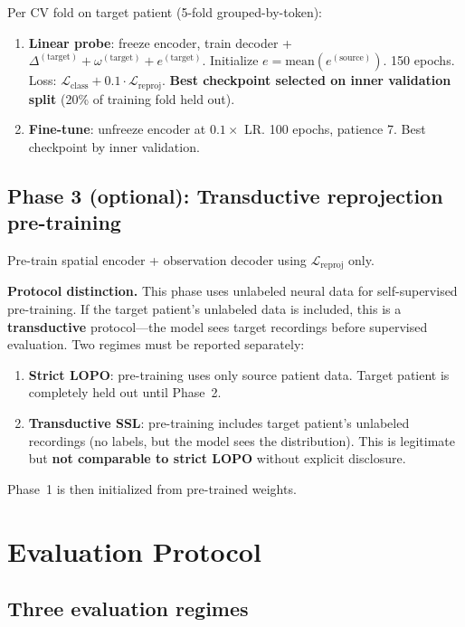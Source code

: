 \documentclass[11pt,letterpaper]{article}
\begin{document}
Per CV fold on target patient (5-fold grouped-by-token):
\begin{enumerate}[leftmargin=2em]
\item \textbf{Linear probe}: freeze encoder, train decoder + $\Delta^{(\text{target})} + \omega^{(\text{target})} + e^{(\text{target})}$. Initialize $e = \text{mean}(e^{(\text{source})})$. 150 epochs. Loss: $\mathcal{L}_{\text{class}} + 0.1 \cdot \mathcal{L}_{\text{reproj}}$. \textbf{Best checkpoint selected on inner validation split} (20\% of training fold held out).
\item \textbf{Fine-tune}: unfreeze encoder at $0.1\times$ LR. 100 epochs, patience 7. Best checkpoint by inner validation.
\end{enumerate}

\subsection{Phase 3 (optional): Transductive reprojection pre-training}\label{sec:phase3}

Pre-train spatial encoder + observation decoder using $\mathcal{L}_{\text{reproj}}$ only.

\textbf{Protocol distinction.} This phase uses unlabeled neural data for self-supervised pre-training. If the target patient's unlabeled data is included, this is a \textbf{transductive} protocol---the model sees target recordings before supervised evaluation. Two regimes must be reported separately:

\begin{enumerate}[leftmargin=2em]
\item \textbf{Strict LOPO}: pre-training uses only source patient data. Target patient is completely held out until Phase~2.
\item \textbf{Transductive SSL}: pre-training includes target patient's unlabeled recordings (no labels, but the model sees the distribution). This is legitimate but \textbf{not comparable to strict LOPO} without explicit disclosure.
\end{enumerate}

Phase~1 is then initialized from pre-trained weights.


\section{Evaluation Protocol}\label{sec:eval-regimes}

\subsection{Three evaluation regimes}
\end{document}
